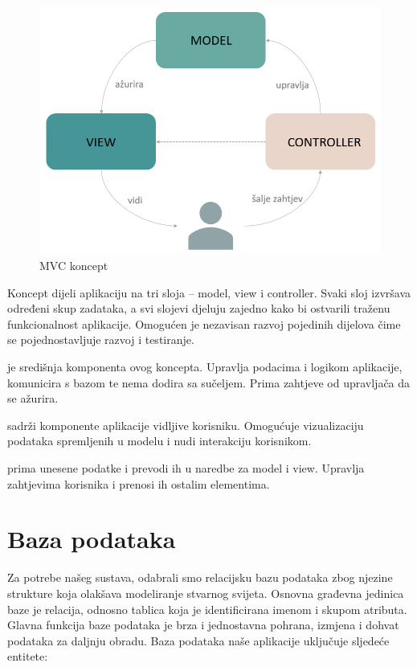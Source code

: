 		\begin{figure}[H]
			\includegraphics[scale=0.7]{slike/mvc.PNG} %
			\centering
			\caption{MVC koncept}
			\label{fig:mvcSkica}
		\end{figure}

		Koncept dijeli aplikaciju na tri sloja – model, view i controller. Svaki sloj izvršava određeni skup zadataka, a svi slojevi djeluju zajedno kako bi ostvarili traženu funkcionalnost aplikacije. Omogućen je nezavisan razvoj pojedinih dijelova čime se pojednostavljuje razvoj i testiranje. 

		 je središnja komponenta ovog koncepta. Upravlja podacima i logikom aplikacije, komunicira s bazom te nema dodira sa sučeljem. Prima zahtjeve od upravljača da se ažurira.

		 sadrži komponente aplikacije vidljive korisniku. Omogućuje vizualizaciju podataka spremljenih u modelu i nudi interakciju  korisnikom.

		  prima unesene podatke i prevodi ih u naredbe za model i view. Upravlja zahtjevima korisnika i prenosi ih ostalim elementima.
				
		\section{Baza podataka}
			
		 Za potrebe našeg sustava, odabrali smo relacijsku bazu podataka zbog njezine strukture koja olakšava modeliranje stvarnog svijeta. Osnovna građevna jedinica baze je relacija, odnosno tablica koja je identificirana imenom i skupom atributa. Glavna funkcija baze podataka je brza i jednostavna pohrana, izmjena i dohvat podataka za daljnju obradu. Baza podataka naše aplikacije uključuje sljedeće entitete:
		
